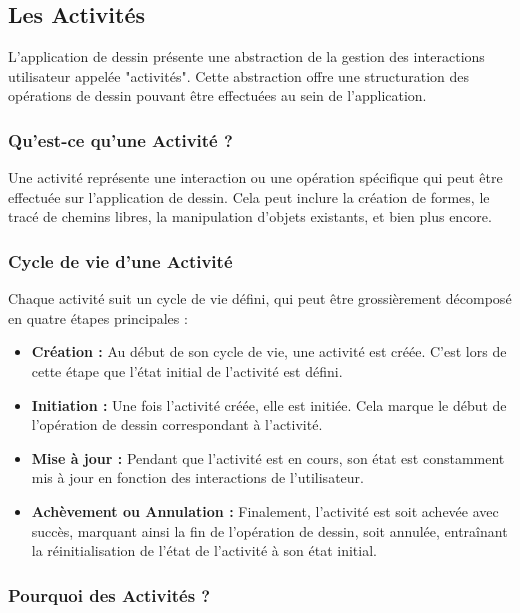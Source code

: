 \subsection{Les Activités}

L'application de dessin présente une abstraction de la gestion des interactions utilisateur appelée "activités". Cette abstraction offre une structuration des opérations de dessin pouvant être effectuées au sein de l'application.

\subsubsection{Qu'est-ce qu'une Activité ?}

Une activité représente une interaction ou une opération spécifique qui peut être effectuée sur l'application de dessin. Cela peut inclure la création de formes, le tracé de chemins libres, la manipulation d'objets existants, et bien plus encore.

\subsubsection{Cycle de vie d'une Activité}

Chaque activité suit un cycle de vie défini, qui peut être grossièrement décomposé en quatre étapes principales :

\begin{itemize}
    \item \textbf{Création :} Au début de son cycle de vie, une activité est créée. C'est lors de cette étape que l'état initial de l'activité est défini.
    \item \textbf{Initiation :} Une fois l'activité créée, elle est initiée. Cela marque le début de l'opération de dessin correspondant à l'activité.
    \item \textbf{Mise à jour :} Pendant que l'activité est en cours, son état est constamment mis à jour en fonction des interactions de l'utilisateur.
    \item \textbf{Achèvement ou Annulation :} Finalement, l'activité est soit achevée avec succès, marquant ainsi la fin de l'opération de dessin, soit annulée, entraînant la réinitialisation de l'état de l'activité à son état initial.
\end{itemize}

\subsubsection{Pourquoi des Activités ?}

